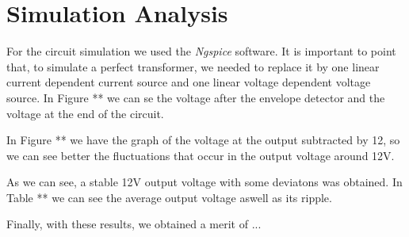 \newpage

\section{Simulation Analysis}
\label{sec:simulation}

For the circuit simulation we used the \textit{Ngspice} software. It is important to point that, to simulate a perfect transformer, we needed to replace it by one linear current dependent current source and one linear voltage dependent voltage source. In Figure ** we can se the voltage after the envelope detector and the voltage at the end of the circuit.


In Figure ** we have the graph of the voltage at the output subtracted by 12, so we can see better the fluctuations that occur in the output voltage around 12V.


As we can see, a stable 12V output voltage with some deviatons was obtained. In Table ** we can see the average output voltage aswell as its ripple.


Finally, with these results, we obtained a merit of ...






